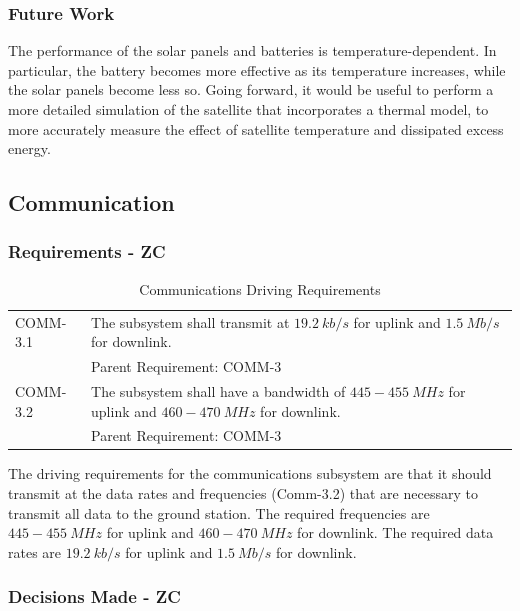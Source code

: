 \documentclass[12pt]{article}
\begin{document}
			\subsubsection{Future Work}
The performance of the solar panels and batteries is temperature-dependent.  In particular, the battery becomes more effective as its temperature increases, while the solar panels become less so.  Going forward, it would be useful to perform a more detailed simulation of the satellite that incorporates a thermal model, to more accurately measure the effect of satellite temperature and dissipated excess energy.

\newpage
\FloatBarrier
		\subsection{Communication}

			\subsubsection{Requirements - ZC}
			
			\begin{table}[ht]
\caption{Communications Driving Requirements}
\begin{tabular}{l p{5in}} 
COMM-3.1 & The subsystem shall transmit at $19.2\ kb/s$ for uplink and $1.5\ Mb/s$ for downlink. \\
& Parent Requirement: COMM-3\\
COMM-3.2 & The subsystem shall have a bandwidth of $445-455\ MHz$ for uplink and $460-470\ MHz$ for downlink. \\
& Parent Requirement: COMM-3\\
\end{tabular}\label{table:comm_requirements}
\end{table}

The driving requirements for the communications subsystem are that it should transmit at the data rates and frequencies (Comm-3.2) that are necessary to transmit all data to the ground station. The required frequencies are $445-455\ MHz$ for uplink and $460-470\ MHz$ for downlink. The required data rates are $19.2\ kb/s$ for uplink and $1.5\ Mb/s$ for downlink.

			\subsubsection{Decisions Made - ZC}\label{sec:comm_decisions}
\end{document}

